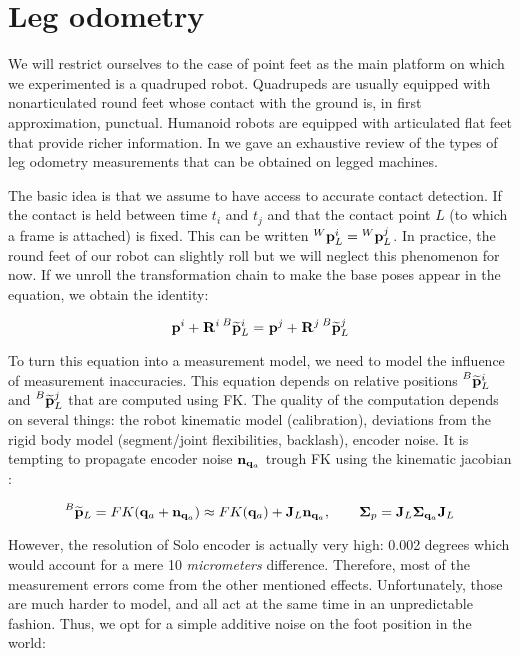 \section{Leg odometry}
We will restrict ourselves to the case of point feet as the main platform on which we experimented is a quadruped robot.
Quadrupeds are usually equipped with nonarticulated round feet whose contact with the ground is, in first approximation, punctual.
Humanoid robots are equipped with articulated flat feet that provide richer information. In  we gave an exhaustive review of the types of leg 
odometry measurements that can be obtained on legged machines.

The basic idea is that we assume to have access to accurate contact detection. If the contact is held between time $t_i$ and $t_j$ and that
the contact point $L$ (to which a frame is attached) is fixed. This can be written $\prescript{W}{}{{\bf p}}_{L}^i = \prescript{W}{}{{\bf p}}_{L}^j$. 
In practice, the round feet of our robot can slightly roll but we will neglect this phenomenon for now. 
If we unroll the transformation chain to make the base poses appear in the equation, we obtain the identity:

\begin{equation}
    \prescript{}{}{{\bf p}}_{}^i + \prescript{}{}{{\bf R}}_{}^i \prescript{B}{}{\widetilde{{\bf p}}}_{L}^i = \prescript{}{}{{\bf p}}_{}^j + \prescript{}{}{{\bf R}}_{}^j \prescript{B}{}{\widetilde{{\bf p}}}_{L}^j
\end{equation}

To turn this equation into a measurement model, we need to model the influence of measurement inaccuracies.
This equation depends on relative positions $\prescript{B}{}{\widetilde{{\bf p}}}_{L}^i$ and $\prescript{B}{}{\widetilde{{\bf p}}}_{L}^j$ that are computed using FK. The quality of the computation depends on several things:
the robot kinematic model (calibration), deviations from the rigid body model (\eg segment/joint flexibilities, backlash), encoder noise.
It is tempting to propagate encoder noise ${\bf n}_{{\bf q}_a}$ trough FK using the kinematic jacobian \cite{bloesch2013state, hartley2018legged}:

\begin{equation}
    \prescript{B}{}{\widetilde{{\bf p}}}_{L} = FK({\bf q}_a + {\bf n}_{{\bf q}_a}) \approx FK({\bf q}_a) + {\bf J}_L{\bf n}_{{\bf q}_a}, \quad \quad {\bm \Sigma}_{p} = {\bf J}_L {\bm \Sigma}_{{\bf q}_a} {\bf J}_L
\end{equation}

However, the resolution of Solo encoder is actually very high: 0.002 degrees which would account for a mere 10 \textit{micrometers} difference.
Therefore, most of the measurement errors come from the other mentioned effects. Unfortunately, those are much harder to model, and all act at the same time
in an unpredictable fashion. Thus, we opt for a simple additive noise on the foot position in the world:

